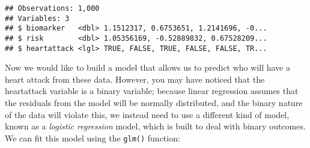 \documentclass[12pt,]{book}
\newenvironment{Shaded}{\begin{snugshade}}{\end{snugshade}}
\newcommand{\CommentTok}[1]{\textcolor[rgb]{0.56,0.35,0.01}{\textit{#1}}}
\newcommand{\DataTypeTok}[1]{\textcolor[rgb]{0.13,0.29,0.53}{#1}}
\newcommand{\DecValTok}[1]{\textcolor[rgb]{0.00,0.00,0.81}{#1}}
\newcommand{\FloatTok}[1]{\textcolor[rgb]{0.00,0.00,0.81}{#1}}
\newcommand{\KeywordTok}[1]{\textcolor[rgb]{0.13,0.29,0.53}{\textbf{#1}}}
\newcommand{\NormalTok}[1]{#1}
\newcommand{\OperatorTok}[1]{\textcolor[rgb]{0.81,0.36,0.00}{\textbf{#1}}}
\newcommand{\StringTok}[1]{\textcolor[rgb]{0.31,0.60,0.02}{#1}}
\begin{document}
\begin{Shaded}
\end{Shaded}

\begin{verbatim}
## Observations: 1,000
## Variables: 3
## $ biomarker   <dbl> 1.1512317, 0.6753651, 1.2141696, -0...
## $ risk        <dbl> 1.05356169, -0.52889832, 0.67528209...
## $ heartattack <lgl> TRUE, FALSE, TRUE, FALSE, FALSE, TR...
\end{verbatim}

Now we would like to build a model that allows us to predict who will have a heart attack from these data. However, you may have noticed that the heartattack variable is a binary variable; because linear regression assumes that the residuals from the model will be normally distributed, and the binary nature of the data will violate this, we instead need to use a different kind of model, known as a \emph{logistic regression} model, which is built to deal with binary outcomes. We can fit this model using the \texttt{glm()} function:
\end{document}
